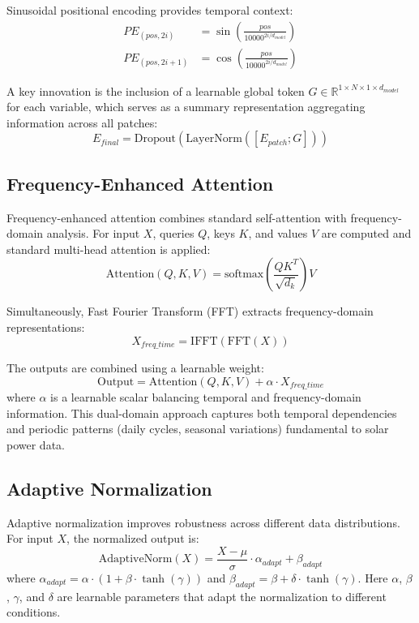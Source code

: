 \documentclass[a4paper,fleqn]{cas-dc}
\begin{document}
Sinusoidal positional encoding provides temporal context:
\begin{align}
PE_{(pos, 2i)} &= \sin\left(\frac{pos}{10000^{2i/d_{model}}}\right) \\
PE_{(pos, 2i+1)} &= \cos\left(\frac{pos}{10000^{2i/d_{model}}}\right)
\end{align}

A key innovation is the inclusion of a learnable global token $G \in \mathbb{R}^{1 \times N \times 1 \times d_{model}}$ for each variable, which serves as a summary representation aggregating information across all patches:
\begin{equation}
E_{final} = \text{Dropout}(\text{LayerNorm}([E_{patch}; G]))
\end{equation}

\subsection{Frequency-Enhanced Attention}

Frequency-enhanced attention combines standard self-attention with frequency-domain analysis. For input $X$, queries $Q$, keys $K$, and values $V$ are computed and standard multi-head attention is applied:
\begin{equation}
\text{Attention}(Q, K, V) = \text{softmax}\left(\frac{QK^T}{\sqrt{d_k}}\right)V
\end{equation}

Simultaneously, Fast Fourier Transform (FFT) extracts frequency-domain representations:
\begin{equation}
X_{freq\_time} = \text{IFFT}(\text{FFT}(X))
\end{equation}

The outputs are combined using a learnable weight:
\begin{equation}
\text{Output} = \text{Attention}(Q, K, V) + \alpha \cdot X_{freq\_time}
\end{equation}
where $\alpha$ is a learnable scalar balancing temporal and frequency-domain information. This dual-domain approach captures both temporal dependencies and periodic patterns (daily cycles, seasonal variations) fundamental to solar power data.

\subsection{Adaptive Normalization}

Adaptive normalization improves robustness across different data distributions. For input $X$, the normalized output is:
\begin{equation}
\text{AdaptiveNorm}(X) = \frac{X - \mu}{\sigma} \cdot \alpha_{adapt} + \beta_{adapt}
\end{equation}
where $\alpha_{adapt} = \alpha \cdot (1 + \beta \cdot \tanh(\gamma))$ and $\beta_{adapt} = \beta + \delta \cdot \tanh(\gamma)$. Here $\alpha$, $\beta$, $\gamma$, and $\delta$ are learnable parameters that adapt the normalization to different conditions.
\end{document}
